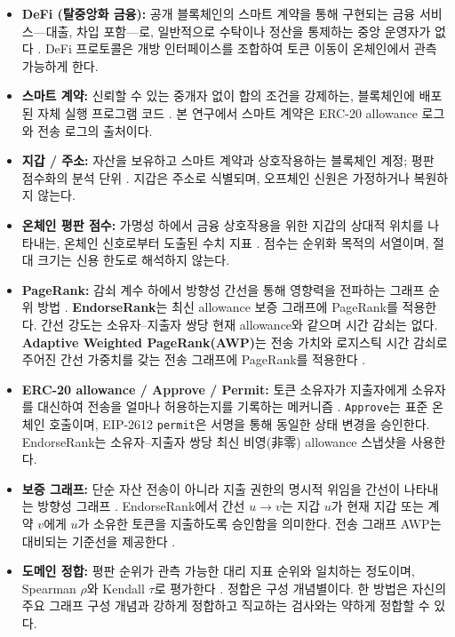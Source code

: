 \begin{itemize}
\item \textbf{DeFi (탈중앙화 금융):} 공개 블록체인의 스마트 계약을 통해 구현되는 금융 서비스---대출, 차입 포함---로, 일반적으로 수탁이나 정산을 통제하는 중앙 운영자가 없다 . DeFi 프로토콜은 개방 인터페이스를 조합하여 토큰 이동이 온체인에서 관측 가능하게 한다.
\item \textbf{스마트 계약:} 신뢰할 수 있는 중개자 없이 합의 조건을 강제하는, 블록체인에 배포된 자체 실행 프로그램 코드 . 본 연구에서 스마트 계약은 ERC-20 allowance 로그와 전송 로그의 출처이다.
\item \textbf{지갑 / 주소:} 자산을 보유하고 스마트 계약과 상호작용하는 블록체인 계정; 평판 점수화의 분석 단위 . 지갑은 주소로 식별되며, 오프체인 신원은 가정하거나 복원하지 않는다.
\item \textbf{온체인 평판 점수:} 가명성 하에서 금융 상호작용을 위한 지갑의 상대적 위치를 나타내는, 온체인 신호로부터 도출된 수치 지표 . 점수는 순위화 목적의 서열이며, 절대 크기는 신용 한도로 해석하지 않는다.
\item \textbf{PageRank:} 감쇠 계수 하에서 방향성 간선을 통해 영향력을 전파하는 그래프 순위 방법 . \textbf{EndorseRank}는 최신 allowance 보증 그래프에 PageRank를 적용한다. 간선 강도는 소유자--지출자 쌍당 현재 allowance와 같으며 시간 감쇠는 없다. \textbf{Adaptive Weighted PageRank(AWP)}는 전송 가치와 로지스틱 시간 감쇠로 주어진 간선 가중치를 갖는 전송 그래프에 PageRank를 적용한다 .
\item \textbf{ERC-20 allowance / Approve / Permit:} 토큰 소유자가 지출자에게 소유자를 대신하여 전송을 얼마나 허용하는지를 기록하는 메커니즘 . \texttt{Approve}는 표준 온체인 호출이며, EIP-2612 \texttt{permit}은 서명을 통해 동일한 상태 변경을 승인한다. EndorseRank는 소유자--지출자 쌍당 최신 비영(非零) allowance 스냅샷을 사용한다.
\item \textbf{보증 그래프:} 단순 자산 전송이 아니라 지출 권한의 명시적 위임을 간선이 나타내는 방향성 그래프 . EndorseRank에서 간선 $u \to v$는 지갑 $u$가 현재 지갑 또는 계약 $v$에게 $u$가 소유한 토큰을 지출하도록 승인함을 의미한다. 전송 그래프 AWP는 대비되는 기준선을 제공한다 .
\item \textbf{도메인 정합:} 평판 순위가 관측 가능한 대리 지표 순위와 일치하는 정도이며, Spearman $\rho$와 Kendall $\tau$로 평가한다 . 정합은 구성 개념별이다. 한 방법은 자신의 주요 그래프 구성 개념과 강하게 정합하고 직교하는 검사와는 약하게 정합할 수 있다.
\end{itemize}

